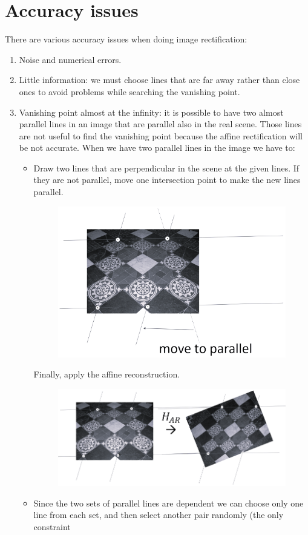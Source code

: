 \documentclass[12pt, a4paper]{report}
\begin{document}
    \section{Accuracy issues}
    There are various accuracy issues when doing image rectification: 
    \begin{enumerate}
        \item Noise and numerical errors. 
        \item Little information: we must choose lines that are far away rather than close ones to avoid problems while searching the vanishing point. 
        \item Vanishing point almost at the infinity: it is possible to have two almost parallel lines in an image that are parallel also in the real scene. Those lines 
            are not useful to find the vanishing point because the affine rectification will be not accurate. When we have two parallel lines in the image we have to: 
            \begin{itemize}
                \item Draw two lines that are perpendicular in the scene at the given lines. If they are not parallel, move one intersection point to make the new lines 
                    parallel. 
                    \begin{figure}[H]
                        \centering
                        \includegraphics[width=0.4\linewidth]{images/vpi.png}
                    \end{figure}
                    Finally, apply the affine reconstruction. 
                    \begin{figure}[H]
                        \centering
                        \includegraphics[width=0.5\linewidth]{images/ar.png}
                    \end{figure}
                \item Since the two sets of parallel lines are dependent we can choose only one line from each set, and then select another pair randomly (the only constraint

\end{itemize}
\end{enumerate}
\end{document}

